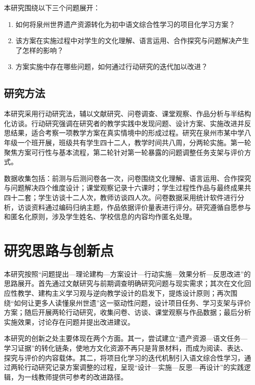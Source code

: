 本研究围绕以下三个问题展开：

\begin{enumerate}[label=（\arabic*）,leftmargin=3em]
  \item 如何将泉州世界遗产资源转化为初中语文综合性学习的项目化学习方案？
  \item 该方案在实施过程中对学生的文化理解、语言运用、合作探究与问题解决产生了怎样的影响？
  \item 方案实施中存在哪些问题，如何通过行动研究的迭代加以改进？
\end{enumerate}

\subsection{研究方法}

本研究采用行动研究法，辅以文献研究、问卷调查、课堂观察、作品分析与半结构化访谈。行动研究强调在研究者的教学实践中发现问题、设计方案、实施改进并反思结果，适合考察一项教学方案在真实情境中的形成过程。研究在泉州市某中学八年级一个班开展，班级共有学生四十二人，教学时间共八周，分两轮实施。第一轮聚焦方案可行性与基本流程，第二轮针对第一轮暴露的问题调整任务支架与评价方式。

数据收集包括：前测与后测问卷各一次，问卷围绕文化理解、语言运用、合作探究与问题解决四个维度设计；课堂观察记录十六课时；学生过程性作品与最终成果共四十二套；学生访谈十二人次，教师访谈四人次。问卷数据采用统计软件进行分析，访谈资料通过编码归纳主题，作品依据评价量表进行评分。研究遵循自愿参与和匿名化原则，涉及学生姓名、学校信息的内容均作匿名处理。

\section{研究思路与创新点}

本研究按照“问题提出—理论建构—方案设计—行动实施—效果分析—反思改进”的思路展开。首先通过文献研究与前期调查明确研究问题与现实需求；其次在文化回应性教学、建构主义学习观与逆向教学设计的启发下，提炼设计原则；再次围绕“如何让更多人读懂泉州世遗”这一驱动性问题，设计项目任务、学习支架与评价方案；随后开展两轮行动研究，收集问卷、访谈、课堂观察与作品数据；最后分析实施效果，讨论存在问题并提出改进建议。

本研究的创新之处主要体现在两个方面。其一，尝试建立“遗产资源—语文任务—学习证据”的转化链条，使地方文化资源不再只是背景材料，而成为阅读、表达、探究与评价的内容载体。其二，将项目化学习的迭代机制引入语文综合性学习，通过两轮行动研究记录方案调整的过程，呈现“设计—实施—反思—再设计”的实践逻辑，为一线教师提供可参考的改进路径。
